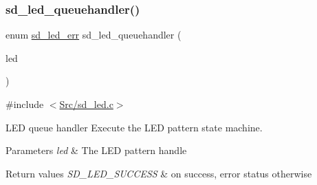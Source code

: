 \subsubsection{\texorpdfstring{sd\+\_\+led\+\_\+queuehandler()}{sd\_led\_queuehandler()}}
{\footnotesize\ttfamily enum \mbox{\hyperlink{group___s_d___l_e_d___types_ga4f347a1003b4089de88a7f0fc62c1071}{sd\+\_\+led\+\_\+err}} sd\+\_\+led\+\_\+queuehandler (\begin{DoxyParamCaption}\item[{struct \mbox{\hyperlink{structsd__led}{sd\+\_\+led}} $\ast$}]{led }\end{DoxyParamCaption})}



{\ttfamily \#include $<$\mbox{\hyperlink{sd__led_8c}{Src/sd\+\_\+led.\+c}}$>$}



L\+ED queue handler Execute the L\+ED pattern state machine. 


\begin{DoxyParams}{Parameters}
{\em led} & The L\+ED pattern handle \\
\hline
\end{DoxyParams}

\begin{DoxyRetVals}{Return values}
{\em S\+D\+\_\+\+L\+E\+D\+\_\+\+S\+U\+C\+C\+E\+SS} & on success, error status otherwise \\
\hline
\end{DoxyRetVals}

